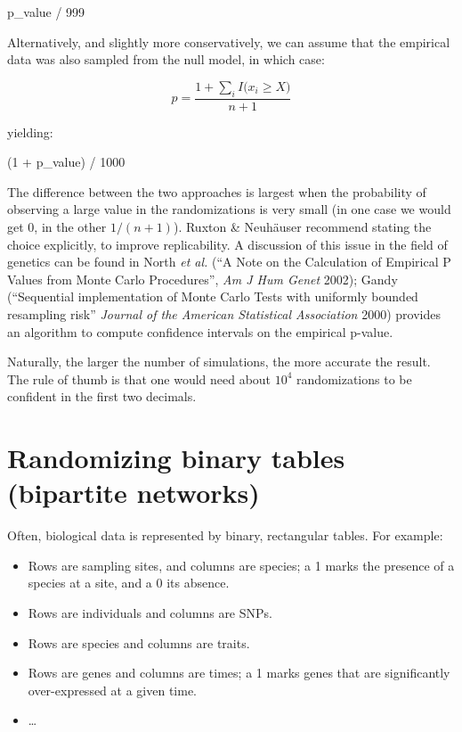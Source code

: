 \documentclass[
  letterpaper,
  DIV=11,
  numbers=noendperiod]{scrreprt}
\newenvironment{Shaded}{\begin{snugshade}}{\end{snugshade}}
\newcommand{\NormalTok}[1]{\textcolor[rgb]{0.00,0.23,0.31}{#1}}
\providecommand{\tightlist}{%
  \setlength{\itemsep}{0pt}\setlength{\parskip}{0pt}}\usepackage{longtable,booktabs,array}
\begin{document}
\begin{Shaded}
\begin{Highlighting}[]
\NormalTok{p\_value / 999}
\end{Highlighting}
\end{Shaded}

Alternatively, and slightly more conservatively, we can assume that the
empirical data was also sampled from the null model, in which case:

\[
p = \frac{1+ \sum_i{I(x_i \geq X})}{n + 1}
\]

yielding:

\begin{Shaded}
\begin{Highlighting}[]
\NormalTok{(1 + p\_value) / 1000}
\end{Highlighting}
\end{Shaded}

The difference between the two approaches is largest when the
probability of observing a large value in the randomizations is very
small (in one case we would get \(0\), in the other \(1/(n+1)\)). Ruxton
\& Neuhäuser recommend stating the choice explicitly, to improve
replicability. A discussion of this issue in the field of genetics can
be found in North \emph{et al.} (``A Note on the Calculation of
Empirical P Values from Monte Carlo Procedures'', \emph{Am J Hum Genet}
2002); Gandy (``Sequential implementation of Monte Carlo Tests with
uniformly bounded resampling risk'' \emph{Journal of the American
Statistical Association} 2000) provides an algorithm to compute
confidence intervals on the empirical p-value.

Naturally, the larger the number of simulations, the more accurate the
result. The rule of thumb is that one would need about \(10^4\)
randomizations to be confident in the first two decimals.

\section{Randomizing binary tables (bipartite
networks)}\label{randomizing-binary-tables-bipartite-networks}

Often, biological data is represented by binary, rectangular tables. For
example:

\begin{itemize}
\tightlist
\item
  Rows are sampling sites, and columns are species; a 1 marks the
  presence of a species at a site, and a 0 its absence.
\item
  Rows are individuals and columns are SNPs.
\item
  Rows are species and columns are traits.
\item
  Rows are genes and columns are times; a 1 marks genes that are
  significantly over-expressed at a given time.
\item
  \ldots{}
\end{itemize}
\end{document}
